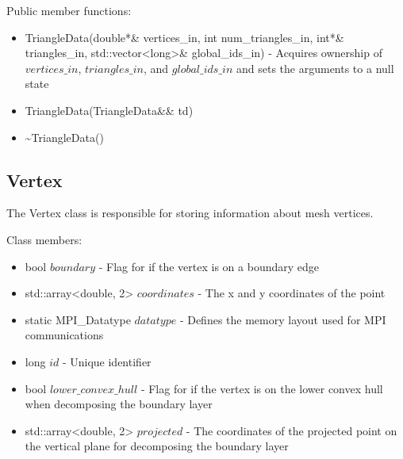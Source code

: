 \documentclass[manuscript, screen]{acmart}
\begin{document}
Public member functions:
\begin{itemize}
\item TriangleData(double*\& vertices\_in, int num\_triangles\_in, int*\& triangles\_in, std::vector<long>\& global\_ids\_in) - Acquires ownership of $vertices\_in$, $triangles\_in$, and $global\_ids\_in$ and sets the arguments to a null state
\item TriangleData(TriangleData\&\& td)
\item \textasciitilde{}TriangleData()
%
\end{itemize}

\subsection{Vertex}
The Vertex class is responsible for storing information about mesh vertices.

Class members:
\begin{itemize}
\item bool $boundary$ - Flag for if the vertex is on a boundary edge
\item std::array<double, 2> $coordinates$ - The x and y coordinates of the point
\item static MPI\_Datatype $datatype$ - Defines the memory layout used for MPI communications
\item long $id$ - Unique identifier
\item bool $lower\_convex\_hull$ - Flag for if the vertex is on the lower convex hull when decomposing the boundary layer
\item std::array<double, 2> $projected$ - The coordinates of the projected point on the vertical plane for decomposing the boundary layer
\end{itemize}
\end{document}
